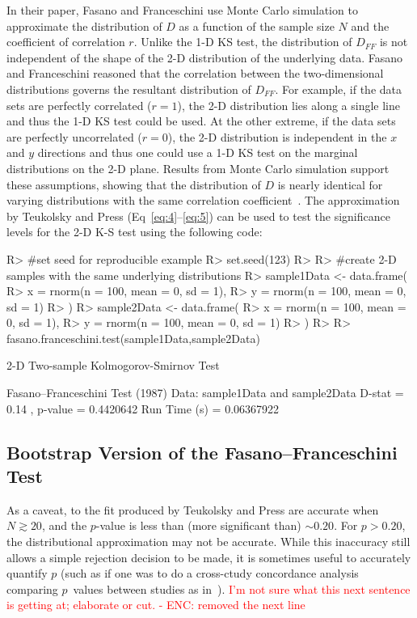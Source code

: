 \documentclass[codesnippet]{jss}
\newcommand{\RBnote}[1]{\textcolor{red}{#1}}
\begin{document}
In their paper, Fasano and Franceschini use Monte Carlo simulation to
approximate the distribution of $D$ as a function of the sample
size $N$ and the coefficient of correlation $r$. Unlike the 1-D KS
test, the distribution of
$D_{FF}$ is not independent of the shape of the 2-D distribution of the
underlying data. Fasano
and Franceschini reasoned that the correlation between
the two-dimensional distributions governs the resultant
distribution of $D_{FF}$. For example, if the data sets are perfectly
correlated ($r = 1$), the 2-D distribution lies along a single line and thus
the 1-D KS test could be used. At the other extreme, if the data sets are perfectly
uncorrelated ($r = 0$), the 2-D distribution is independent in the $x$
and $y$ directions and thus one could use a 1-D KS test on the marginal
distributions on the 2-D plane.
%
Results from Monte Carlo simulation support these assumptions, showing
that the distribution of $D$ is nearly identical for varying
distributions with the same correlation coefficient~\citep{Fasano1987}.
The approximation
by Teukolsky and Press (Eq~\ref{eq:4}--\ref{eq:5})
can be used to test the significance levels for the 2-D K-S test using
the following code:
%
\begin{CodeChunk}
\begin{CodeInput}
R> #set seed for reproducible example
R> set.seed(123)
R>
R> #create 2-D samples with the same underlying distributions
R> sample1Data <- data.frame(
R>  x = rnorm(n = 100, mean = 0, sd = 1),
R>  y = rnorm(n = 100, mean = 0, sd = 1)
R> )
R> sample2Data <- data.frame(
R>  x = rnorm(n = 100, mean = 0, sd = 1),
R>  y = rnorm(n = 100, mean = 0, sd = 1)
R> )
R>
R> fasano.franceschini.test(sample1Data,sample2Data)
\end{CodeInput}
\begin{CodeOutput}
      2-D Two-sample Kolmogorov-Smirnov Test

 Fasano--Franceschini Test (1987)
 Data:  sample1Data and sample2Data
 D-stat =  0.14 , p-value =  0.4420642
 Run Time (s) =  0.06367922
\end{CodeOutput}
\end{CodeChunk}

\subsection{Bootstrap Version of the Fasano--Franceschini Test}

As a caveat, to the fit produced by Teukolsky and Press are accurate when $N \gtrsim 20$, and the $p$-value is less than (more significant than) $\sim 0.20$. For $p > 0.20$, the distributional approximation may not be accurate. While this inaccuracy still allows a simple rejection decision to be made, it is sometimes useful to accurately quantify $p$ (such as if one was to do a cross-ctudy concordance analysis comparing $p$~values between studies as in~\citep{Ness-Cohn2020}).
%
\RBnote{I'm not sure what this next sentence is getting at; elaborate or cut. - ENC: removed the next line}
\end{document}
